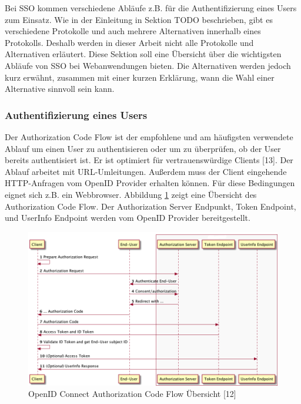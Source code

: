 Bei SSO kommen verschiedene Abläufe z.B. für die Authentifizierung eines Users zum Einsatz. Wie in der Einleitung in Sektion TODO beschrieben, gibt es verschiedene Protokolle und auch mehrere Alternativen innerhalb eines Protokolls. Deshalb werden in dieser Arbeit nicht alle Protokolle und Alternativen erläutert. Diese Sektion soll eine Übersicht über die wichtigsten Abläufe von SSO bei Webanwendungen bieten. Die Alternativen werden jedoch kurz erwähnt, zusammen mit einer kurzen Erklärung, wann die Wahl einer Alternative sinnvoll sein kann.

\subsubsection{Authentifizierung eines Users}

Der Authorization Code Flow ist der empfohlene und am häufigsten verwendete Ablauf um einen User zu authentisieren oder um zu überprüfen, ob der User bereits authentisiert ist. Er ist optimiert für vertrauenswürdige Clients [13]. Der Ablauf arbeitet mit URL-Umleitungen. Außerdem muss der Client eingehende HTTP-Anfragen vom OpenID Provider erhalten können. Für diese Bedingungen eignet sich z.B. ein Webbrowser. Abbildung \ref{fig:EB_AuthorizationCodeFlow} zeigt eine Übersicht des Authorization Code Flow. Der Authorization Server Endpunkt, Token Endpoint, und UserInfo Endpoint werden vom OpenID Provider bereitgestellt.


\begin{figure}[!ht]
	\centering
	\includegraphics[width=1\textwidth]{Images/Ebert/AuthorizationCodeFlow.png}
	\caption{OpenID Connect Authorization Code Flow Übersicht [12]}
	\label{fig:EB_AuthorizationCodeFlow}
\end{figure} %

